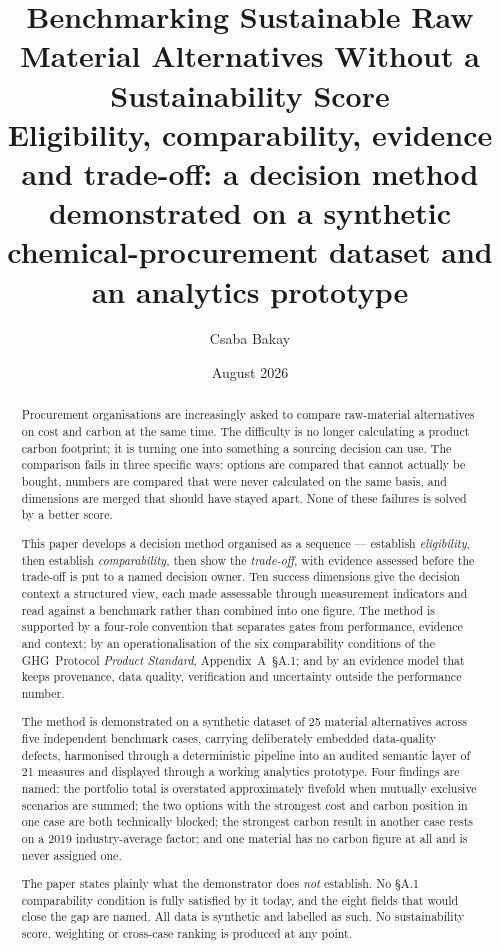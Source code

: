 \documentclass[10pt,twocolumn,a4paper]{article}
\title{\vspace{-1.4em}\Large\bfseries Benchmarking Sustainable Raw Material
Alternatives Without a Sustainability Score\\[0.35em]
\large\mdseries Eligibility, comparability, evidence and trade-off: a decision method
demonstrated on a synthetic chemical-procurement dataset and an analytics prototype}
\author{Csaba Bakay}
\date{August 2026}
\begin{document}
\maketitle

\begin{abstract}
\noindent
Procurement organisations are increasingly asked to compare raw-material
alternatives on cost and carbon at the same time. The difficulty is no longer
calculating a product carbon footprint; it is turning one into something a
sourcing decision can use. The comparison fails in three specific ways: options are compared that cannot actually be bought, numbers are
compared that were never calculated on the same basis, and dimensions are merged
that should have stayed apart. None of these failures is solved by a better
score.

This paper develops a decision method organised as a sequence --- establish
\emph{eligibility}, then establish \emph{comparability}, then show the
\emph{trade-off}, with evidence assessed before the trade-off is put to a named
decision owner. Ten success dimensions give the decision context a structured
view, each made assessable through measurement indicators and read against a
benchmark rather than combined into one figure. The method is supported by a
four-role convention that separates gates from
performance, evidence and context; by an operationalisation of the six
comparability conditions of the GHG~Protocol \emph{Product Standard},
Appendix~A~\S A.1; and by an evidence model that keeps provenance, data quality,
verification and uncertainty outside the performance number.

The method is demonstrated on a synthetic dataset of 25 material alternatives
across five independent benchmark cases, carrying deliberately embedded
data-quality defects, harmonised through a deterministic pipeline into an audited
semantic layer of 21 measures and displayed through a working analytics
prototype. Four findings are named: the portfolio total is overstated
approximately fivefold when mutually exclusive scenarios are summed; the two
options with the strongest cost and carbon position in one case are both
technically blocked; the strongest carbon result in another case rests on a 2019
industry-average factor; and one material has no carbon figure at all and is
never assigned one.

The paper states plainly what the demonstrator does \emph{not} establish. No
\S A.1 comparability condition is fully satisfied by it today, and the eight
fields that would close the gap are named. All data is synthetic and labelled as
such. No sustainability score, weighting or cross-case ranking is produced at any
point.
\end{abstract}
\end{document}
